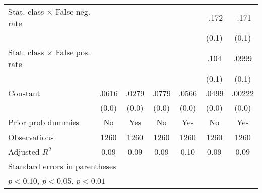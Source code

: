 \begin{table}[htbp]
\begin{tabular}{l*{6}{c}}
Stat. class $\times$ False neg. rate&                  &                  &                  &                  &    -.172\sym{*}  &    -.171\sym{*}  \\
                &                  &                  &                  &                  &    (0.1)         &    (0.1)         \\
Stat. class $\times$ False pos. rate&                  &                  &                  &                  &     .104         &    .0999         \\
                &                  &                  &                  &                  &    (0.1)         &    (0.1)         \\
Constant        &    .0616\sym{***}&    .0279         &    .0779\sym{***}&    .0566         &    .0499\sym{**} &   .00222         \\
                &    (0.0)         &    (0.0)         &    (0.0)         &    (0.0)         &    (0.0)         &    (0.0)         \\
Prior prob dummies &       No         &      Yes         &       No         &      Yes         &       No         &      Yes         \\
\hline
Observations    &     1260         &     1260         &     1260         &     1260         &     1260         &     1260         \\
Adjusted \(R^{2}\)&     0.09         &     0.09         &     0.09         &     0.10         &     0.09         &     0.09         \\
\hline\hline
\multicolumn{7}{l}{\footnotesize Standard errors in parentheses}\\
\multicolumn{7}{l}{\footnotesize \sym{*} \(p<0.10\), \sym{**} \(p<0.05\), \sym{***} \(p<0.01\)}\\
\end{tabular}
\end{table}
